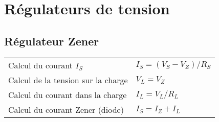 \section{Régulateurs de tension}
\subsection{Régulateur Zener}
\begin{center}
    
\end{center}
\begin{tabular}{ll}
    Calcul du courant $I_S$ & \( I_S= (V_S-V_Z)/R_S\)\\
    Calcul de la tension sur la charge & \(V_L=V_Z \)\\
    Calcul du courant dans la charge & \( I_L = V_L/R_L\)\\
    Calcul du courant Zener (diode) & \( I_S=I_Z+I_L\)
\end{tabular}


